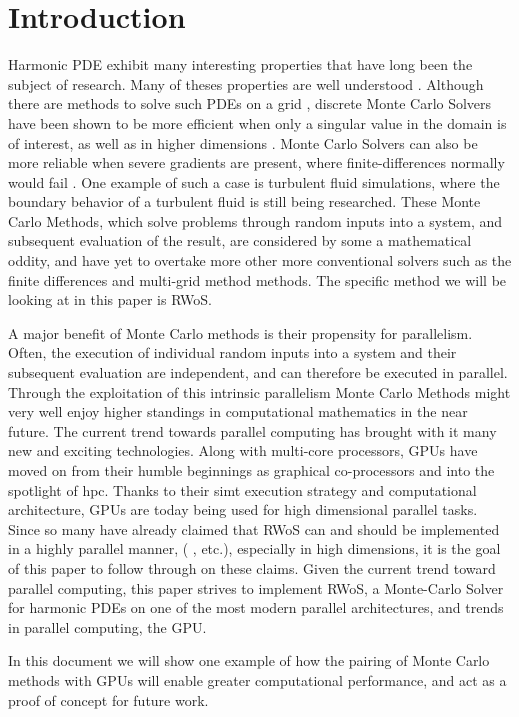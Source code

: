 
\chapter{Introduction}
\label{chapter:Introduction}


Harmonic \Gls{PDE} exhibit many interesting properties that
have long been the subject of research.    Many of theses properties are well
understood \cite{Axler1992,Sheldon}.  Although there are methods to solve such
\Glspl{PDE} on a grid \cite{Bornemann}, discrete Monte Carlo Solvers have been shown
to be more efficient when only a
singular value in the domain is of interest, as well as in higher dimensions
\cite{Bornemann, DeLaurentis, kakutani1944}.  Monte Carlo Solvers can also
be more reliable when severe gradients are present,
where finite-differences normally would fail \cite{DeLaurentis}. One example of such a case is
 turbulent fluid simulations, where the boundary behavior of a turbulent
fluid is still being researched.  These Monte Carlo Methods, which solve problems
through random inputs into a system, and subsequent evaluation of the result,
are considered by some a mathematical oddity, and have yet
to overtake more other more conventional solvers such as the finite differences and multi-grid method
methods.  The specific method we will be looking at in this paper is \Gls{RWoS}.
\par
A major benefit of Monte Carlo methods is their propensity for parallelism.  Often,
the execution of individual random inputs into a system  and their subsequent evaluation
are independent, and can therefore be executed in parallel.  Through the exploitation of this
intrinsic parallelism Monte Carlo Methods might very well enjoy higher standings
in computational mathematics in the near future.
The current trend towards parallel computing has brought with it many new and exciting
technologies.  Along with multi-core processors, \Glspl{GPU} have moved on from
their humble beginnings as graphical co-processors and into the spotlight of \gls{hpc}.  Thanks to their
\Gls{simt} execution strategy and computational architecture, \Glspl{GPU} are today being used for
high dimensional parallel tasks. Since so many have already
claimed that \Gls{RWoS} can and should be implemented in a highly parallel manner,
( \cite{DeLaurentis,Sabelfeld}, etc.), especially in high dimensions,  it is the goal
 of this paper to follow through on these claims.  Given the
current trend toward parallel computing, this paper strives to implement
\Gls{RWoS}, a Monte-Carlo Solver for harmonic \Glspl{PDE} on one of the most modern
parallel architectures, and trends in parallel computing, the \Gls{GPU}.
\par
In this document we will show
one example of how the pairing of Monte Carlo methods with \Glspl{GPU} will enable
greater computational performance, and act as a proof of concept for future work.


